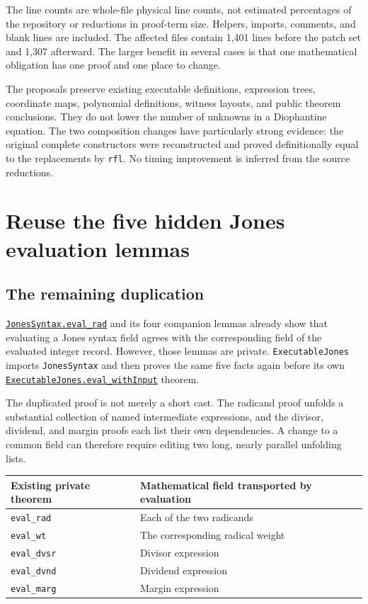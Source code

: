 \documentclass[11pt,letterpaper]{article}
\newcommand{\code}[1]{\nolinkurl{#1}}
\newcommand{\source}[2]{\href{https://github.com/VladimirReshetnikov/ProveIt/blob/efa64ca941cdae37bb6f7fc5093ae8bb69296ca3/Computability/DiophantineConsistency/Lean/DiophantineConsistency/#1.lean}{\code{#1.#2}}}
\begin{document}
The line counts are whole-file physical line counts, not estimated percentages of the repository or reductions in proof-term size. Helpers, imports, comments, and blank lines are included. The affected files contain 1,401 lines before the patch set and 1,307 afterward. The larger benefit in several cases is that one mathematical obligation has one proof and one place to change.

The proposals preserve existing executable definitions, expression trees, coordinate maps, polynomial definitions, witness layouts, and public theorem conclusions. They do not lower the number of unknowns in a Diophantine equation. The two composition changes have particularly strong evidence: the original complete constructors were reconstructed and proved definitionally equal to the replacements by \code{rfl}. No timing improvement is inferred from the source reductions.

\section{Reuse the five hidden Jones evaluation lemmas}
\label{sec:jones}

\subsection{The remaining duplication}

\source{JonesSyntax}{eval_rad} and its four companion lemmas already show that evaluating a Jones syntax field agrees with the corresponding field of the evaluated integer record. However, those lemmas are private. \code{ExecutableJones} imports \code{JonesSyntax} and then proves the same five facts again before its own \source{ExecutableJones}{eval_withInput} theorem.

The duplicated proof is not merely a short cast. The radicand proof unfolds a substantial collection of named intermediate expressions, and the divisor, dividend, and margin proofs each list their own dependencies. A change to a common field can therefore require editing two long, nearly parallel unfolding lists.

\begin{center}
\begin{tabularx}{\textwidth}{@{}lX@{}}
\toprule
Existing private theorem & Mathematical field transported by evaluation \\
\midrule
\code{eval_rad} & Each of the two radicands \\
\code{eval_wt} & The corresponding radical weight \\
\code{eval_dvsr} & Divisor expression \\
\code{eval_dvnd} & Dividend expression \\
\code{eval_marg} & Margin expression \\
\bottomrule
\end{tabularx}
\end{center}
\end{document}
